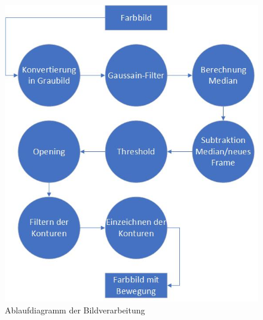 \begin{figure}[ht]
	\flushright
	\includegraphics[]{content/pictures/Bildverarbeitung.jpg}
	\caption{Ablaufdiagramm der Bildverarbeitung}
\end{figure}

